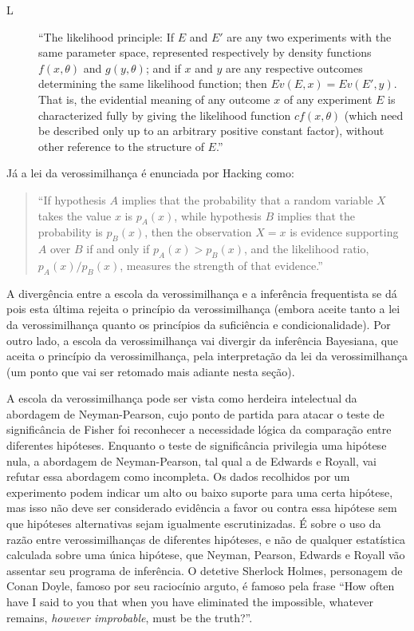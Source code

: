 \begin{description}
\item[L]
``The likelihood principle: If $E$ and $E\prime$ are any two experiments with the same parameter space,
 represented respectively by density functions $f(x, \theta)$ and $g(y, \theta)$; and if $x$ and $y$ are
 any respective outcomes determining the same likelihood function; then $Ev(E, x) = Ev(E\prime, y)$.
 That is, the evidential meaning of any outcome $x$ of any experiment $E$ is characterized fully by giving
 the likelihood function $cf(x, \theta)$ (which need be described only up to an arbitrary positive constant
 factor), without other reference to the structure of $E$.''
\citep{Birnbaum62}
\end{description}

Já a lei da verossimilhança é enunciada por Hacking como:

\begin{quote}
``If hypothesis $A$ implies that the probability that a random variable $X$ takes the value $x$ is $p_A(x)$, while
hypothesis $B$ implies that the probability is $p_B(x)$, then the observation $X=x$ is evidence supporting 
$A$ over $B$ if and only if $p_A(x) > p_B(x)$, and the likelihood ratio, $p_A(x)/p_B(x)$, measures the strength
 of that evidence.''
\citep{Hacking65}
\end{quote}

A divergência entre a escola da verossimilhança e a inferência frequentista se dá pois esta última rejeita o
princípio da verossimilhança (embora aceite tanto a lei da verossimilhança quanto os princípios da suficiência
e condicionalidade). Por outro lado, a escola da verossimilhança vai divergir da inferência Bayesiana, que aceita
o princípio da verossimilhança, pela interpretação da lei da verossimilhança (um  ponto
que vai ser retomado mais adiante nesta seção).

A escola da verossimilhança pode ser vista como herdeira intelectual da abordagem de Neyman-Pearson, cujo ponto de partida
para atacar o teste de significância de Fisher foi reconhecer a
necessidade lógica da comparação entre diferentes hipóteses.
Enquanto o teste de significância privilegia uma hipótese nula, a abordagem de Neyman-Pearson, tal qual a de Edwards e Royall,
vai refutar essa abordagem como incompleta. Os dados recolhidos por um experimento podem indicar um alto ou baixo
suporte para uma certa hipótese, 
mas isso não deve ser considerado evidência a favor ou contra essa hipótese sem
que hipóteses alternativas sejam igualmente escrutinizadas. É sobre o uso da razão entre verossimilhanças de diferentes hipóteses,
e não de qualquer estatística calculada sobre uma única hipótese, que Neyman, Pearson, Edwards e Royall vão assentar seu
programa de inferência. O detetive Sherlock Holmes, personagem de Conan Doyle, famoso por seu raciocínio arguto, é famoso
pela frase ``How often have I said to you that when you have eliminated the impossible, whatever remains, {\em however 
improbable}, must be the truth?''.


